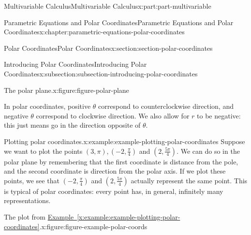 \documentclass[twoside,10pt,]{book}
\newcommand{\xreffont}{\relax}
\numberwithin{equation}{part}
\begin{document}
\begin{partptx}{Multivariable Calculus}{}{Multivariable Calculus}{}{}{x:part:part-multivariable}
\begin{chapterptx}{Parametric Equations and Polar Coordinates}{}{Parametric Equations and Polar Coordinates}{}{}{x:chapter:parametric-equations-polar-coordinates}
\begin{sectionptx}{Polar Coordinates}{}{Polar Coordinates}{}{}{x:section:section-polar-coordinates}
\begin{subsectionptx}{Introducing Polar Coordinates}{}{Introducing Polar Coordinates}{}{}{x:subsection:subsection-introducing-polar-coordinates}
\begin{figureptx}{The polar plane.}{x:figure:figure-polar-plane}{}
\begin{image}{0}{1}{0}
{
}%
\end{image}%
\tcblower
\end{figureptx}%
In polar coordinates, positive \(\theta\) correspond to counterclockwise direction, and negative \(\theta\) correspond to clockwise direction. We also allow for \(r\) to be negative: this just means go in the direction opposite of \(\theta\).%
\begin{example}{Plotting polar coordinates.}{x:example:example-plotting-polar-coordinates}%
Suppose we want to plot the points \((3,\pi), (-2,\frac{\pi}{4})\) and \((2,\frac{5\pi}{4}).\) We can do so in the polar plane by remembering that the first coordinate is distance from the pole, and the second coordinate is direction from the polar axis. If we plot these points, we see that \((-2,\frac{\pi}{4})\) and \((2,\frac{5\pi}{4})\) actually represent the same point. This is typical of polar coordinates: every point has, in general, infinitely many representations.%
\end{example}
\begin{figureptx}{The plot from \hyperref[x:example:example-plotting-polar-coordinates]{Example~{\xreffont\ref{x:example:example-plotting-polar-coordinates}}}.}{x:figure:figure-example-polar-coords}{}%
\begin{image}{0}{1}{0}%
\end{image}
\end{figureptx}
\end{subsectionptx}
\end{sectionptx}
\end{chapterptx}
\end{partptx}
\end{document}
